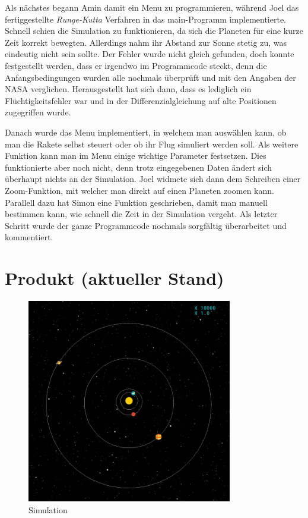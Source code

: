 \documentclass{article}
\begin{document}
Als nächstes begann Amin damit ein Menu zu programmieren, während Joel das fertiggestellte \textit{Runge-Kutta} Verfahren in das main-Programm implementierte. Schnell schien die Simulation zu funktionieren, da sich die Planeten für eine kurze Zeit korrekt bewegten. Allerdings nahm ihr Abstand zur Sonne stetig zu, was eindeutig nicht sein sollte. Der Fehler wurde nicht gleich gefunden, doch konnte festgestellt werden, dass er irgendwo im Programmcode steckt, denn die Anfangsbedingungen wurden alle nochmals überprüft und mit den Angaben der NASA verglichen. Herausgestellt hat sich dann, dass es lediglich ein Flüchtigkeitsfehler war und in der Differenzialgleichung auf alte Positionen zugegriffen wurde.

Danach wurde das Menu implementiert, in welchem man auswählen kann, ob man die Rakete selbst steuert oder ob ihr Flug simuliert werden soll. Als weitere Funktion kann man im Menu einige wichtige Parameter festsetzen. Dies funktionierte aber noch nicht, denn trotz eingegebenen Daten ändert sich überhaupt nichts an der Simulation. Joel widmete sich dann dem Schreiben einer Zoom-Funktion, mit welcher man direkt auf einen Planeten zoomen kann. Parallell dazu hat Simon eine Funktion geschrieben, damit man manuell bestimmen kann, wie schnell die Zeit in der Simulation vergeht. 
Als letzter Schritt wurde der ganze Programmcode nochmals sorgfältig überarbeitet und kommentiert.

\section{Produkt (aktueller Stand)}
\begin{figure}[hbt]
	\centering
		\includegraphics[width=0.8\textwidth]{game.png}
	\caption{Simulation}
	\label{img:simulation}
\end{figure}
\end{document}
